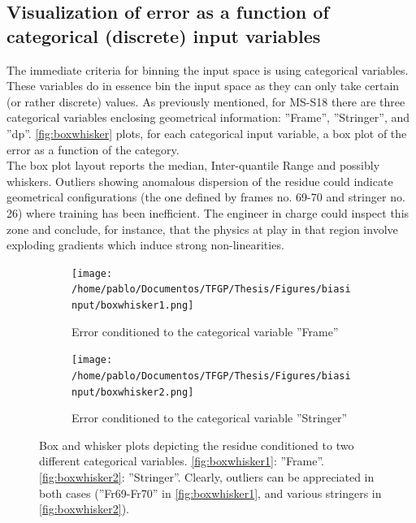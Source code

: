 \subsection{Visualization of error as a function of categorical (discrete) input variables}
The immediate criteria for binning the input space is using categorical variables. These variables do in essence bin the input space as they can only take certain (or rather discrete) values. As previously mentioned, for MS-S18 there are three categorical variables enclosing geometrical information: ''Frame'', ''Stringer'', and ''dp''. \autoref{fig:boxwhisker} plots, for each categorical input variable, a box plot of the error as a function of the category.\\
\indent The box plot layout reports the median, Inter-quantile Range and possibly whiskers. Outliers showing anomalous dispersion of the residue could indicate geometrical configurations (\eg the one defined by frames no. 69-70 and stringer no. 26) where training has been inefficient. The engineer in charge could inspect this zone and conclude, for instance, that the physics at play in that region involve exploding gradients which induce strong non-linearities.\\
\begin{figure}
	\centering
	\begin{subfigure}[b]{\textwidth}
		\centering
		\texttt{[image: /home/pablo/Documentos/TFGP/Thesis/Figures/biasinput/boxwhisker1.png]}
		\caption{Error conditioned to the categorical variable ''Frame''}
		\label{fig:boxwhisker1}
	\end{subfigure}
	
	\vspace{1cm} %
	
	\begin{subfigure}[b]{\textwidth}
		\centering
		\texttt{[image: /home/pablo/Documentos/TFGP/Thesis/Figures/biasinput/boxwhisker2.png]}
		\caption{Error conditioned to the categorical variable ''Stringer''}
		\label{fig:boxwhisker2}
	\end{subfigure}
	
	\caption{Box and whisker plots depicting the residue conditioned to two different categorical variables. \autoref{fig:boxwhisker1}: ''Frame''. \autoref{fig:boxwhisker2}: ''Stringer''. Clearly, outliers can be appreciated in both cases (''Fr69-Fr70'' in \autoref{fig:boxwhisker1}, and various stringers in \autoref{fig:boxwhisker2}).}
	\label{fig:boxwhisker}
\end{figure}
%
\FloatBarrier
